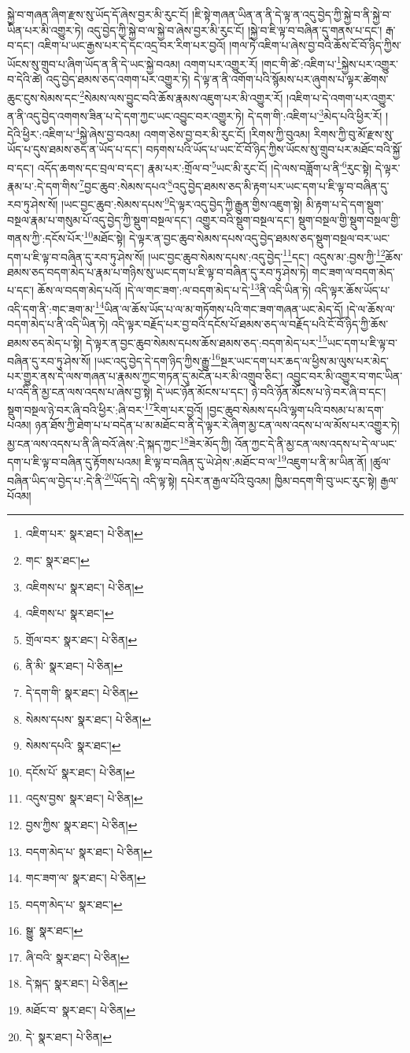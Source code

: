 སྐྱེ་བ་གཞན་ཞིག་རྫས་སུ་ཡོད་དོ་ཞེས་བྱར་མི་རུང་ངོ། །ཇི་སྟེ་གཞན་ཡིན་ན་ནི་དེ་ལྟ་ན་འདུ་བྱེད་ཀྱི་སྐྱེ་བ་ནི་སྐྱེ་བ་ཡིན་པར་མི་འགྱུར་ཏེ། འདུ་བྱེད་ཀྱི་སྐྱེ་བ་ལ་སྐྱེ་བ་ཞེས་བྱར་མི་རུང་ངོ། །སྐྱེ་བ་ཇི་ལྟ་བ་བཞིན་དུ་གནས་པ་དང་། རྒ་བ་དང་། འཇིག་པ་ཡང་རྒྱས་པར་དེ་དང་འདྲ་བར་རིག་པར་བྱའོ། །གལ་ཏེ་འཇིག་པ་ཞེས་བྱ་བའི་ཆོས་ངོ་བོ་ཉིད་ཀྱིས་ཡོངས་སུ་གྲུབ་པ་ཞིག་ཡོད་ན་ནི་དེ་ཡང་སྐྱེ་བའམ། འགག་པར་འགྱུར་རོ། །གང་གི་ཚེ་:འཇིག་པ་\footnote{འཇིག་པར་  སྣར་ཐང་།  པེ་ཅིན། }སྐྱེས་པར་འགྱུར་བ་དེའི་ཚེ། འདུ་བྱེད་ཐམས་ཅད་འགག་པར་འགྱུར་ཏེ། དེ་ལྟ་ན་ནི་འགོག་པའི་སྙོམས་པར་ཞུགས་པ་ལྟར་ཚེགས་ཆུང་ངུས་སེམས་དང་\footnote{གང་  སྣར་ཐང་། }སེམས་ལས་བྱུང་བའི་ཆོས་རྣམས་འཇུག་པར་མི་འགྱུར་རོ། །འཇིག་པ་དེ་འགག་པར་འགྱུར་ན་ནི་འདུ་བྱེད་འགགས་ཟིན་པ་དེ་དག་ཀྱང་ཡང་འབྱུང་བར་འགྱུར་ཏེ། དེ་དག་གི་:འཇིག་པ་\footnote{འཇིགས་པ་  སྣར་ཐང་།  པེ་ཅིན། }མེད་པའི་ཕྱིར་རོ། །དེའི་ཕྱིར་:འཇིག་པ་\footnote{འཇིགས་པ་  སྣར་ཐང་། }སྐྱེ་ཞེས་བྱ་བའམ། འགག་ཅེས་བྱ་བར་མི་རུང་ངོ། །རིགས་ཀྱི་བུའམ། རིགས་ཀྱི་བུ་མོ་རྫས་སུ་ཡོད་པ་དུས་ཐམས་ཅད་ན་ཡོད་པ་དང་། བཏགས་པའི་ཡོད་པ་ཡང་ངོ་བོ་ཉིད་ཀྱིས་ཡོངས་སུ་གྲུབ་པར་མཐོང་བའི་སྐྱོ་བ་དང་། འདོད་ཆགས་དང་བྲལ་བ་དང་། རྣམ་པར་:གྲོལ་བ་\footnote{གྲོལ་བར་  སྣར་ཐང་།  པེ་ཅིན། }ཡང་མི་རུང་ངོ། །དེ་ལས་བཟློག་པ་ནི་\footnote{ནི་མི་  སྣར་ཐང་།  པེ་ཅིན། }རུང་སྟེ། དེ་ལྟར་རྣམ་པ་:དེ་དག་གིས་\footnote{དེ་དག་གི་  སྣར་ཐང་།  པེ་ཅིན། }བྱང་ཆུབ་:སེམས་དཔའ་\footnote{སེམས་དཔས་  སྣར་ཐང་།  པེ་ཅིན། }འདུ་བྱེད་ཐམས་ཅད་མི་རྟག་པར་ཡང་དག་པ་ཇི་ལྟ་བ་བཞིན་དུ་རབ་ཏུ་ཤེས་སོ། །ཡང་བྱང་ཆུབ་:སེམས་དཔས་\footnote{སེམས་དཔའི་  སྣར་ཐང་། }དེ་ལྟར་འདུ་བྱེད་ཀྱི་རྒྱུན་གྱིས་འཇུག་སྟེ། མི་རྟག་པ་དེ་དག་སྡུག་བསྔལ་རྣམ་པ་གསུམ་པོ་འདུ་བྱེད་ཀྱི་སྡུག་བསྔལ་དང་། འགྱུར་བའི་སྡུག་བསྔལ་དང་། སྡུག་བསྔལ་གྱི་སྡུག་བསྔལ་གྱི་གནས་ཀྱི་:དངོས་པོར་\footnote{དངོས་པོ་  སྣར་ཐང་།  པེ་ཅིན། }མཐོང་སྟེ། དེ་ལྟར་ན་བྱང་ཆུབ་སེམས་དཔས་འདུ་བྱེད་ཐམས་ཅད་སྡུག་བསྔལ་བར་ཡང་དག་པ་ཇི་ལྟ་བ་བཞིན་དུ་རབ་ཏུ་ཤེས་སོ། །ཡང་བྱང་ཆུབ་སེམས་དཔས་:འདུ་བྱེད་\footnote{འདུས་བྱས་  སྣར་ཐང་།  པེ་ཅིན། }དང་། འདུས་མ་:བྱས་ཀྱི་\footnote{བྱས་ཀྱིས་  སྣར་ཐང་།  པེ་ཅིན། }ཆོས་ཐམས་ཅད་བདག་མེད་པ་རྣམ་པ་གཉིས་སུ་ཡང་དག་པ་ཇི་ལྟ་བ་བཞིན་དུ་རབ་ཏུ་ཤེས་ཏེ། གང་ཟག་ལ་བདག་མེད་པ་དང་། ཆོས་ལ་བདག་མེད་པའོ། །དེ་ལ་གང་ཟག་:ལ་བདག་མེད་པ་དེ་\footnote{བདག་མེད་པ་  སྣར་ཐང་།  པེ་ཅིན། }ནི་འདི་ཡིན་ཏེ། འདི་ལྟར་ཆོས་ཡོད་པ་འདི་དག་ནི་:གང་ཟག་མ་\footnote{གང་ཟག་ལ་  སྣར་ཐང་།  པེ་ཅིན། }ཡིན་ལ་ཆོས་ཡོད་པ་ལ་མ་གཏོགས་པའི་གང་ཟག་གཞན་ཡང་མེད་དོ། །དེ་ལ་ཆོས་ལ་བདག་མེད་པ་ནི་འདི་ཡིན་ཏེ། འདི་ལྟར་བརྗོད་པར་བྱ་བའི་དངོས་པོ་ཐམས་ཅད་ལ་བརྗོད་པའི་ངོ་བོ་ཉིད་ཀྱི་ཆོས་ཐམས་ཅད་མེད་པ་སྟེ། དེ་ལྟར་ན་བྱང་ཆུབ་སེམས་དཔས་ཆོས་ཐམས་ཅད་:བདག་མེད་པར་\footnote{བདག་མེད་པ་  སྣར་ཐང་། }ཡང་དག་པ་ཇི་ལྟ་བ་བཞིན་དུ་རབ་ཏུ་ཤེས་སོ། །ཡང་འདུ་བྱེད་དེ་དག་ཉིད་ཀྱིས་རྒྱུ་\footnote{སྒྱུ་  སྣར་ཐང་། }སྔར་ཡང་དག་པར་ཆད་ལ་ཕྱིས་མ་ལུས་པར་མེད་པར་གྱུར་ནས་དེ་ལས་གཞན་པ་རྣམས་ཀྱང་གཏན་དུ་མངོན་པར་མི་འགྲུབ་ཅིང་། འབྱུང་བར་མི་འགྱུར་བ་གང་ཡིན་པ་འདི་ནི་མྱ་ངན་ལས་འདས་པ་ཞེས་བྱ་སྟེ། དེ་ཡང་ཉོན་མོངས་པ་དང་། ཉེ་བའི་ཉོན་མོངས་པ་ཉེ་བར་ཞི་བ་དང་། སྡུག་བསྔལ་ཉེ་བར་ཞི་བའི་ཕྱིར་:ཞི་བར་\footnote{ཞི་བའི་  སྣར་ཐང་།  པེ་ཅིན། }རིག་པར་བྱའོ། །བྱང་ཆུབ་སེམས་དཔའི་ལྷག་པའི་བསམ་པ་མ་དག་པའམ། ཉན་ཐོས་ཀྱི་ཐེག་པ་པ་བདེན་པ་མ་མཐོང་བ་ནི་དེ་ལྟར་རེ་ཞིག་མྱ་ངན་ལས་འདས་པ་ལ་མོས་པར་འགྱུར་ཏེ། མྱ་ངན་ལས་འདས་པ་ནི་ཞི་བའོ་ཞེས་:དེ་སྐད་ཀྱང་\footnote{དེ་སྐད་  སྣར་ཐང་།  པེ་ཅིན། }ཟེར་མོད་ཀྱི། འོན་ཀྱང་དེ་ནི་མྱ་ངན་ལས་འདས་པ་དེ་ལ་ཡང་དག་པ་ཇི་ལྟ་བ་བཞིན་དུ་རྟོགས་པའམ། ཇི་ལྟ་བ་བཞིན་དུ་ཡེ་ཤེས་:མཐོང་བ་ལ་\footnote{མཐོང་བ་  སྣར་ཐང་།  པེ་ཅིན། }འཇུག་པ་ནི་མ་ཡིན་ནོ། །ཚུལ་བཞིན་ཡིད་ལ་བྱེད་པ་:དེ་ནི་\footnote{དེ་  སྣར་ཐང་།  པེ་ཅིན། }ཡོད་དེ། འདི་ལྟ་སྟེ། དཔེར་ན་རྒྱལ་པོའི་བུའམ། ཁྱིམ་བདག་གི་བུ་ཡང་རུང་སྟེ། རྒྱལ་པོའམ། 
